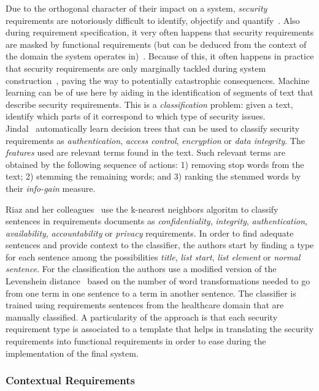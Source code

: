 Due to the orthogonal character of their impact on a system, \emph{security}
requirements are notoriously difficult to identify, objectify and
quantify~\cite{}. Also during requirement specification, it very often happens
that security requirements are masked by functional requirements (but can be
deduced from the context of the domain the system operates in)~\cite{Riaz:2014}.
Because of this, it often happens in practice that security requirements are
only marginally tackled during system construction~\cite{}, paving the way to
potentially catastrophic consequences.
Machine learning can be of use here by aiding in the identification of segments
of text that describe security requirements. This is a \emph{classification}
problem: given a text, identify which parts of it correspond to which type of
security issues.\\

Jindal\etal~\cite{Jildal:2016} automatically learn decision trees that can be
used to classify security requirements as \emph{authentication}, \emph{access
control}, \emph{encryption} or \emph{data integrity}. The \emph{features} used
are relevant terms found in the text. Such relevant terms are obtained by the
following sequence of actions: 1) removing stop words from the text; 2) stemming
the remaining words; and 3) ranking the stemmed words by their \emph{info-gain}
measure.

Riaz and her colleagues~\cite{Riaz:2014} use the k-nearest neighbors algoritm to
classify sentences in requirements documents as \emph{confidentiality},
\emph{integrity}, \emph{authentication}, \emph{availability},
\emph{accountability} or \emph{privacy} requirements. In order to find adequate
sentences and provide context to the classifier, the authors start by finding a
type for each sentence among the possibilities \emph{title}, \emph{list start},
\emph{list element} or \emph{normal sentence}. For the classification the
authors use a modified version of the Levenshein distance~\cite{} based
on the number of word transformations needed to go from one term in one sentence to a term in
another sentence. The classifier is trained using requirements sentences from
the healthcare domain that are manually classified. A particularity of the
approach is that each security requirement type is associated to a template that
helps in translating the security requirements into functional requirements in
order to ease during the implementation of the final system.


\cite{Knauss:2011} 

\subsubsection{Contextual Requirements} 

